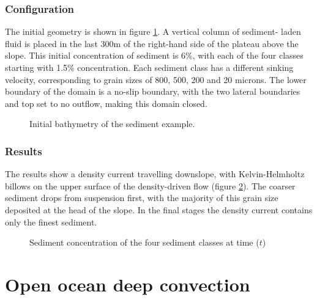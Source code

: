 \subsubsection{Configuration}

The initial geometry is shown in figure \ref{Fig:sediment:bathymetry}. A vertical column of sediment-
laden fluid is placed in the last 300m of the right-hand side of the plateau above the slope. 
This initial concentration of sediment is 6\%, with each of the four classes starting with
1.5\% concentration. Each sediment class has a different sinking velocity, corresponding to 
grain sizes of 800, 500, 200 and 20 microns. The lower boundary of the domain is a 
no-slip boundary, with the two lateral boundaries and top set to no outflow, making this domain closed.

\begin{figure}[ht]
  \centering
  \caption{Initial bathymetry of the sediment example.}
  \label{Fig:sediment:bathymetry}
\end{figure}

\subsubsection{Results}

The results show a density current travelling downslope, with Kelvin-Helmholtz billows
on the upper surface of the density-driven flow (figure \ref{fig:sediment_concentration}). 
The coarser sediment drops from suspension first, with the majority of this
grain size deposited at the head of the slope. In the final stages the density current contains
only the finest sediment.
\begin{figure}[ht]
  \centering
  \caption{Sediment concentration of the four sediment classes at time ($t$)}
  \label{fig:sediment_concentration}
\end{figure}





\section{Open ocean deep convection}
\label{sect:OODC}
